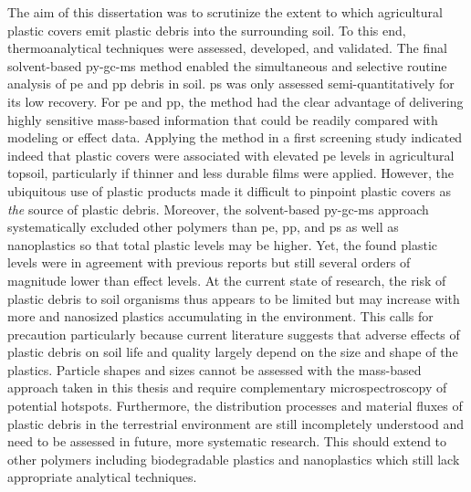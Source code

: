 The aim of this dissertation was to scrutinize the extent to which agricultural plastic covers emit plastic debris into the surrounding soil. To this end, thermoanalytical techniques were assessed, developed, and validated. The final solvent-based \ac{py-gc-ms} method enabled the simultaneous and selective routine analysis of \ac{pe} and \ac{pp} debris in soil. \Ac{ps} was only assessed semi-quantitatively for its low recovery. For \ac{pe} and \ac{pp}, the method had the clear advantage of delivering highly sensitive mass-based information that could be readily compared with modeling or effect data. Applying the method in a first screening study indicated indeed that plastic covers were associated with elevated \ac{pe} levels in agricultural topsoil, particularly if thinner and less durable films were applied. However, the ubiquitous use of plastic products made it difficult to pinpoint plastic covers as \emph{the} source of plastic debris. Moreover, the solvent-based \ac{py-gc-ms} approach systematically excluded other polymers than \ac{pe}, \ac{pp}, and \ac{ps} as well as nanoplastics so that total plastic levels may be higher. Yet, the found plastic levels were in agreement with previous reports but still several orders of magnitude lower than effect levels.
At the current state of research, the risk of plastic debris to soil organisms thus appears to be limited but may increase with more and nanosized plastics accumulating in the environment. This calls for precaution particularly because current literature suggests that adverse effects of plastic debris on soil life and quality largely depend on the size and shape of the plastics. Particle shapes and sizes cannot be assessed with the mass-based approach taken in this thesis and require complementary microspectroscopy of potential hotspots.
Furthermore, the distribution processes and material fluxes of plastic debris in the terrestrial environment are still incompletely understood and need to be assessed in future, more systematic research. This should extend to other polymers including biodegradable plastics and nanoplastics which still lack appropriate analytical techniques.
